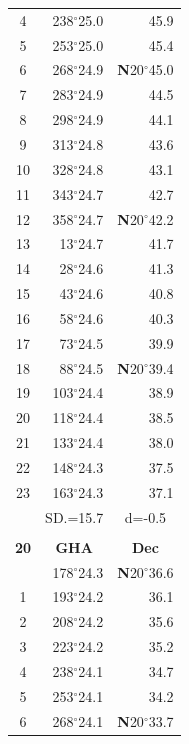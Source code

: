 \documentclass[10pt, a4paper]{report}
\begin{document}
\begin{scriptsize}
\begin{tabular*}{0.2\textwidth}[t]{@{\extracolsep{\fill}}|c|rr|}
4 & 238$^\circ$25.0 & 45.9\\
5 & 253$^\circ$25.0 & 45.4\\[2Pt]
6 & 268$^\circ$24.9 & \textbf{N}20$^\circ$45.0\\
7 & 283$^\circ$24.9 & 44.5\\
8 & 298$^\circ$24.9 & 44.1\\
9 & 313$^\circ$24.8 & \raisebox{0.24ex}{\boldmath$\cdot$~\boldmath$\cdot$~~}43.6\\
10 & 328$^\circ$24.8 & 43.1\\
11 & 343$^\circ$24.7 & 42.7\\[2Pt]
12 & 358$^\circ$24.7 & \textbf{N}20$^\circ$42.2\\
13 & 13$^\circ$24.7 & 41.7\\
14 & 28$^\circ$24.6 & 41.3\\
15 & 43$^\circ$24.6 & \raisebox{0.24ex}{\boldmath$\cdot$~\boldmath$\cdot$~~}40.8\\
16 & 58$^\circ$24.6 & 40.3\\
17 & 73$^\circ$24.5 & 39.9\\[2Pt]
18 & 88$^\circ$24.5 & \textbf{N}20$^\circ$39.4\\
19 & 103$^\circ$24.4 & 38.9\\
20 & 118$^\circ$24.4 & 38.5\\
21 & 133$^\circ$24.4 & \raisebox{0.24ex}{\boldmath$\cdot$~\boldmath$\cdot$~~}38.0\\
22 & 148$^\circ$24.3 & 37.5\\
23 & 163$^\circ$24.3 & 37.1\\
\hline
\rule{0pt}{2.4ex} & \multicolumn{1}{c}{SD.=15.7} & \multicolumn{1}{c|}{d=-0.5}\\
\hline
\multicolumn{1}{c}{}\\[-0.5ex]\hline
\multicolumn{1}{|c|}{\rule{0pt}{2.6ex}\textbf{20}} & \multicolumn{1}{c}{\textbf{GHA}} & \multicolumn{1}{c|}{\textbf{Dec}}\\
\hline\rule{0pt}{2.6ex}\noindent
0 & 178$^\circ$24.3 & \textbf{N}20$^\circ$36.6\\
1 & 193$^\circ$24.2 & 36.1\\
2 & 208$^\circ$24.2 & 35.6\\
3 & 223$^\circ$24.2 & \raisebox{0.24ex}{\boldmath$\cdot$~\boldmath$\cdot$~~}35.2\\
4 & 238$^\circ$24.1 & 34.7\\
5 & 253$^\circ$24.1 & 34.2\\[2Pt]
6 & 268$^\circ$24.1 & \textbf{N}20$^\circ$33.7\\

\end{tabular*}
\end{scriptsize}
\end{document}
